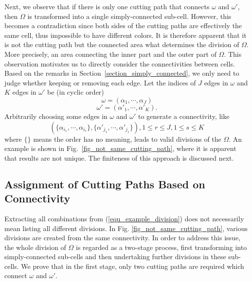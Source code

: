\documentclass[journal]{IEEEtran}
\begin{document}
Next, we observe that if there is only one cutting path that connects $\omega$ and $\omega'$, then $\Omega$ is transformed into a 
single simply-connected sub-cell. However, this becomes a contradiction since both sides of the cutting paths are effectively the same cell, 
thus impossible to have different colors. It is therefore apparent that it is not the cutting path but the connected area what determines 
the division of $\Omega$. More precisely, an area connecting the inner part and the outer part of $\Omega$. 
This observation motivates us to directly consider the connectivities between cells. Based on the remarks in 
Section~\ref{section_simply_connected}, we only need to judge whether keeping or removing each edge. 
Let the indices of $J$ edges in $\omega$ and $K$ edges in $\omega'$ be (in cyclic order) 
\begin{equation}\label{equ_omega}
\omega = (\alpha_1, \cdots, \alpha_J)
\end{equation}
\begin{equation}\label{equ_omega_prime}
\omega' = (\alpha'_1, \cdots, \alpha'_K).
\end{equation}
Arbitrarily choosing some edges in $\omega$ and $\omega'$ to generate a connectivity, like
\begin{equation}\label{equ_example_division}
(\{\alpha_{i_1}, \cdots, \alpha_{i_r}\}, \{\alpha'_{j_1}, \cdots, \alpha'_{j_s}\} ), 1\leq r\leq J, 1\leq s\leq K
\end{equation}
where $\{\}$ means the order has no meaning, leads to valid divisions of the $\Omega$. An example is shown in 
Fig.~\ref{fig_not_same_cutting_path}, where it is apparent that results are not unique. The finiteness of this approach is discussed next. 


\subsection{Assignment of Cutting Paths Based on Connectivity}
\label{subsection_arbitrary_assignment}
Extracting all combinations from (\ref{equ_example_division}) does not necessarily mean listing all different divisions. 
In Fig. \ref{fig_not_same_cutting_path}, various divisions are created from the same connectivity. 
In order to address this issue, the whole division of $\Omega$ is regarded as a two-stage process, first transforming into simply-connected sub-cells and then undertaking further divisions in these sub-cells. 
We prove that in the first stage, only two cutting paths are required which connect $\omega$ and $\omega'$. 
\end{document}
